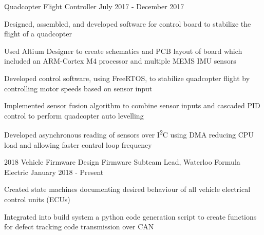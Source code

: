 

\begin{cventries}

  \cventry
    {Quadcopter Flight Controller} %
    {} %
    {} %
    {July 2017 - December 2017} %
    {
      \begin{cvitems} %
        \item {Designed, assembled, and developed software for control board to stabilize the flight of a quadcopter}
        \item {Used Altium Designer to create schematics and PCB layout of board which included an ARM-Cortex M4 processor and multiple MEMS IMU sensors}
        \item {Developed control software, using FreeRTOS, to stabilize quadcopter flight by controlling motor speeds based on sensor input}
        \item {Implemented sensor fusion algorithm to combine sensor inputs and cascaded PID control to perform quadcopter auto levelling}
        \item {Developed asynchronous reading of sensors over I\textsuperscript{2}C using DMA reducing CPU load and allowing faster control loop frequency}
      \end{cvitems}
    }

  \cventrytwo
    {2018 Vehicle Firmware Design} %
    {Firmware Subteam Lead, Waterloo Formula Electric} %
    {} %
    {January 2018 - Present} %
    {
      \begin{cvitems}
        \item {Created state machines documenting desired behaviour of all vehicle electrical control units (ECUs)}
        \item {Integrated into build system a python code generation script to create functions for defect tracking code transmission over CAN}
      \end{cvitems}
    }


\end{cventries}
